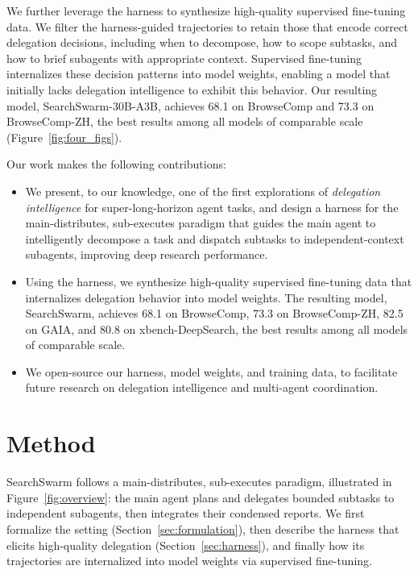 \documentclass[table]{gtech}
\begin{document}
We further leverage the harness to synthesize high-quality supervised fine-tuning data. We filter the harness-guided trajectories to retain those that encode correct delegation decisions, including when to decompose, how to scope subtasks, and how to brief subagents with appropriate context. Supervised fine-tuning internalizes these decision patterns into model weights, enabling a model that initially lacks delegation intelligence to exhibit this behavior. Our resulting model, SearchSwarm-30B-A3B, achieves 68.1 on BrowseComp and 73.3 on BrowseComp-ZH, the best results among all models of comparable scale (Figure~\ref{fig:four_figs}).

Our work makes the following contributions:
\begin{itemize}[leftmargin=*]
\item We present, to our knowledge, one of the first explorations of \emph{delegation intelligence} for super-long-horizon agent tasks, and design a harness for the main-distributes, sub-executes paradigm that guides the main agent to intelligently decompose a task and dispatch subtasks to independent-context subagents, improving deep research performance.
\item Using the harness, we synthesize high-quality supervised fine-tuning data that internalizes delegation behavior into model weights. The resulting model, SearchSwarm, achieves 68.1 on BrowseComp, 73.3 on BrowseComp-ZH, 82.5 on GAIA, and 80.8 on xbench-DeepSearch, the best results among all models of comparable scale.
\item We open-source our harness, model weights, and training data, to facilitate future research on delegation intelligence and multi-agent coordination.
\end{itemize}
\section{Method}
\label{sec:method}

SearchSwarm follows a main-distributes, sub-executes paradigm, illustrated in Figure~\ref{fig:overview}: the main agent plans and delegates bounded subtasks to independent subagents, then integrates their condensed reports. We first formalize the setting (Section~\ref{sec:formulation}), then describe the harness that elicits high-quality delegation (Section~\ref{sec:harness}), and finally how its trajectories are internalized into model weights via supervised fine-tuning.
\end{document}
